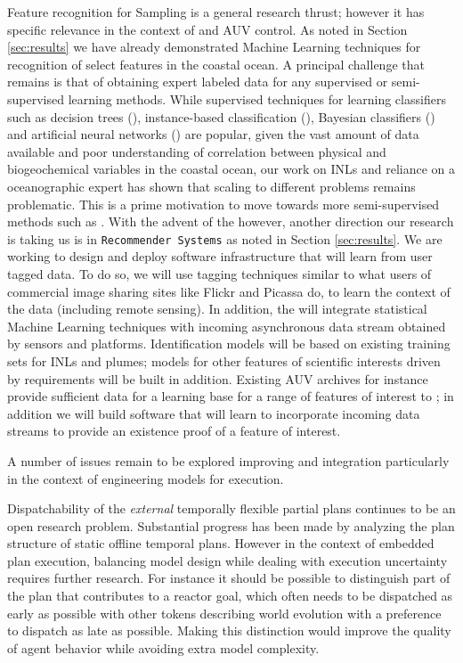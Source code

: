 Feature recognition for Sampling is a general research thrust; however
it has specific relevance in the context of \rx and AUV control. As
noted in Section \ref{sec:results} we have already demonstrated
Machine Learning techniques for recognition of select features in the
coastal ocean. A principal challenge that remains is that of obtaining
expert labeled data for any supervised or semi-supervised learning
methods.  While supervised techniques for learning classifiers such as
decision trees (\cite{Quinlan93-dtrees}), instance-based
classification (\cite{Aha-ibl-ml91}), Bayesian classifiers
(\cite{Jensen2001-BNetworks}) and artificial neural networks
(\cite{ANNsurvey-2000}) are popular, given the vast amount of data
available and poor understanding of correlation between physical and
biogeochemical variables in the coastal ocean, our work on INLs
\cite{mcgann08d,ryan10} and reliance on a oceanographic expert has
shown that scaling to different problems remains problematic. This is
a prime motivation to move towards more semi-supervised methods such
as \cite{kumar11}. With the advent of the \od however,
another direction our research is taking us is in \texttt{Recommender
  Systems} \cite{Adomavicius05} as noted in Section
\ref{sec:results}. We are working to design and deploy software
infrastructure that will learn from user tagged data. To do so, we
will use tagging techniques similar to what users of commercial image
sharing sites like Flickr and Picassa do, to learn the context of the
data (including remote sensing). In addition, the \od will integrate
statistical Machine Learning techniques with incoming asynchronous
data stream obtained by sensors and platforms. Identification models
will be based on existing training sets for INLs and plumes; models
for other features of scientific interests driven by \can requirements
will be built in addition. Existing AUV archives for instance provide
sufficient data for a learning base for a range of features of
interest to \can; in addition we will build software that will learn
to incorporate incoming data streams to provide an existence proof of
a feature of interest.

A number of issues remain to be explored improving \rx and \eu
integration particularly in the context of engineering models for
execution.

Dispatchability of the {\em external} temporally flexible partial
plans continues to be an open research problem. Substantial progress
has been made \cite{vidal97,mus98a,tsam98,morris00} by analyzing the
plan structure of static offline temporal plans. However in the
context of embedded plan execution, balancing model design while
dealing with execution uncertainty requires further research. For
instance it should be possible to distinguish part of the plan that
contributes to a reactor goal, which often needs to be dispatched as
early as possible with other tokens describing world evolution with a
preference to dispatch as late as possible. Making this distinction
would improve the quality of agent behavior while avoiding extra model
complexity.


